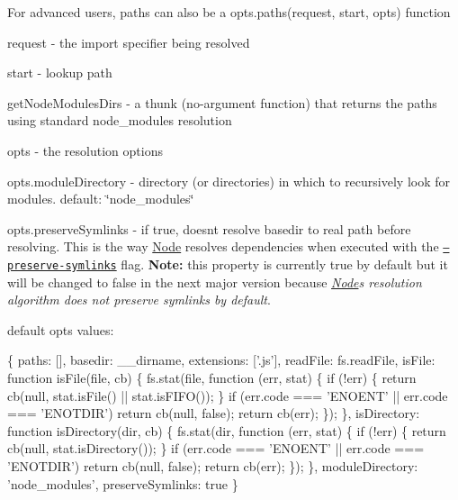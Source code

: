 \begin{DoxyItemize}
For advanced users, {\ttfamily paths} can also be a {\ttfamily opts.\+paths(request, start, opts)} function
\begin{DoxyItemize}
\item request -\/ the import specifier being resolved
\item start -\/ lookup path
\item get\+Node\+Modules\+Dirs -\/ a thunk (no-\/argument function) that returns the paths using standard {\ttfamily node\+\_\+modules} resolution
\item opts -\/ the resolution options
\end{DoxyItemize}
\item opts.\+module\+Directory -\/ directory (or directories) in which to recursively look for modules. default\+: {\ttfamily \char`\"{}node\+\_\+modules\char`\"{}}
\item opts.\+preserve\+Symlinks -\/ if true, doesn\textquotesingle{}t resolve {\ttfamily basedir} to real path before resolving. This is the way \mbox{\hyperlink{classNode}{Node}} resolves dependencies when executed with the \href{https://nodejs.org/api/all.html#cli_preserve_symlinks}{\tt --preserve-\/symlinks} flag. {\bfseries Note\+:} this property is currently {\ttfamily true} by default but it will be changed to {\ttfamily false} in the next major version because {\itshape \mbox{\hyperlink{classNode}{Node}}\textquotesingle{}s resolution algorithm does not preserve symlinks by default}.
\end{DoxyItemize}

default {\ttfamily opts} values\+:


\begin{DoxyCode}
\{
    paths: [],
    basedir: \_\_dirname,
    extensions: ['.js'],
    readFile: fs.readFile,
    isFile: function isFile(file, cb) \{
        fs.stat(file, function (err, stat) \{
            if (!err) \{
                return cb(null, stat.isFile() || stat.isFIFO());
            \}
            if (err.code === 'ENOENT' || err.code === 'ENOTDIR') return cb(null, false);
            return cb(err);
        \});
    \},
    isDirectory: function isDirectory(dir, cb) \{
        fs.stat(dir, function (err, stat) \{
            if (!err) \{
                return cb(null, stat.isDirectory());
            \}
            if (err.code === 'ENOENT' || err.code === 'ENOTDIR') return cb(null, false);
            return cb(err);
        \});
    \},
    moduleDirectory: 'node\_modules',
    preserveSymlinks: true
\}
\end{DoxyCode}


